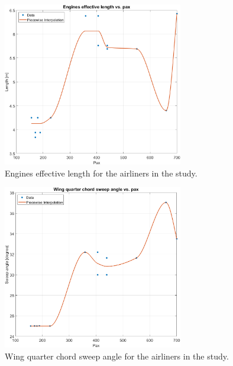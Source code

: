 \documentclass[english]{kththesis}
\begin{document}
\begin{figure}[!ht]
    \centering
    \includegraphics[width=0.7\textwidth]{Epictures/EnginesLengthVSPax.png}
    \caption{Engines effective length for the airliners in the study.}
    \label{fig:EngLePax}
\end{figure}

\begin{figure}[!ht]
    \centering
    \includegraphics[width=0.7\textwidth]{Epictures/WingSweepAngleVSPax.png}
    \caption{Wing quarter chord sweep angle for the airliners in the study.}
    \label{fig:WingSweepPax}
\end{figure}
\end{document}
